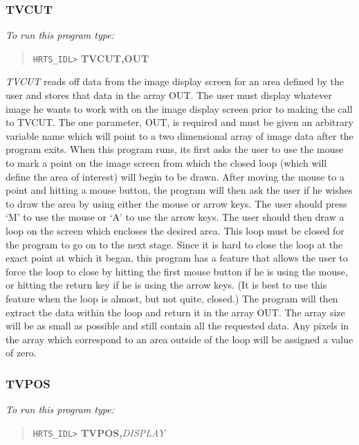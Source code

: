\subsubsection{TVCUT}

{\em To run this program type:}
\begin{quote}   
     {\tt HRTS\_IDL>} {\bf TVCUT,OUT}               
\end{quote}

{\em TVCUT} reads off data from the image display screen for an area defined by 
the user and stores that data in the array OUT. The user must display whatever
image he wants to work with on the image display screen prior to making the 
call to TVCUT.  The one parameter, OUT, is required and must be given an
arbitrary variable name which will point to a two dimensional array of image
data after the program exits.  When this program runs, its first asks the user
to use the mouse to mark a point on the image screen from which the closed loop
(which will define the area of interest) will begin to be drawn.  After moving
the mouse to a point and hitting a mouse button, the program will then ask the
user if he wishes to draw the area by using either the mouse or arrow keys. 
The user should press `M' to use the mouse or `A' to use the arrow keys.  The
user should then draw a loop on the  screen which encloses the desired area. 
This loop must be closed for the program to go on to the next stage.  Since it
is hard to close the loop at the exact point at which it began, this program
has a feature that allows the user to force the loop to close by hitting the
first mouse button if he is using the mouse, or hitting the return key if he is
using the arrow keys.  (It is best to use this feature when the loop is almost,
but not quite, closed.) The program will then extract the data within the loop
and return it in the array OUT.  The array size will be as small as possible
and still contain all the requested data.  Any pixels in the array which
correspond to an area outside of the loop will be assigned a value of zero.

\subsubsection{TVPOS}

{\em To run this program type:}   
\begin{quote}      
     {\tt HRTS\_IDL>} {\bf TVPOS,}{\it DISPLAY}                
\end{quote}   

